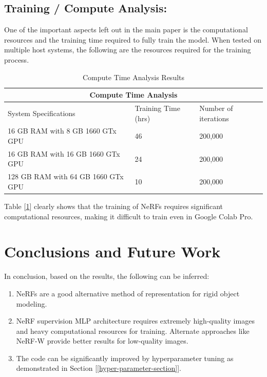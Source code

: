 \documentclass[conference]{IEEEtran}
\begin{document}
\subsection{Training / Compute Analysis:}
One of the important aspects left out in the main paper \cite{yen2022nerfsupervision} is the computational resources and the training time required to fully train the model. When tested on multiple host systems, the following are the resources required for the training process.

\begin{table}[h!]
\centering
\begin{tabular}{ |p{2.5cm}|p{2.3cm}|p{2.5cm}|  }
 \hline
 \multicolumn{3}{|c|}{Compute Time Analysis} \\
 \hline
 System Specifications & Training Time (hrs) & Number of iterations \\
 \hline
 16 GB RAM with 8 GB 1660 GTx GPU  & 46 & 200,000 \\ \hline
 16 GB RAM with 16 GB 1660 GTx GPU  & 24 & 200,000 \\ \hline
 128 GB RAM  with 64 GB 1660 GTx GPU &   10  & 200,000 \\
 \hline 
\end{tabular}
\vspace{2mm}
 \caption{Compute Time Analysis Results}
\label{table:2}
\end{table}

Table [\ref{table:2}] clearly shows that the training of NeRFs requires significant computational resources, making it difficult to train even in Google Colab Pro.

\section{Conclusions and Future Work}
In conclusion, based on the results, the following can be inferred:

\begin{enumerate}
\item NeRFs are a good alternative method of representation for rigid object modeling.
\item NeRF supervision MLP architecture requires extremely high-quality images and heavy computational resources for training. Alternate approaches like NeRF-W provide better results for low-quality images.
\item The code can be significantly improved by hyperparameter tuning as demonstrated in Section [\ref{hyper-parameter-section}].
\end{enumerate}
\end{document}
